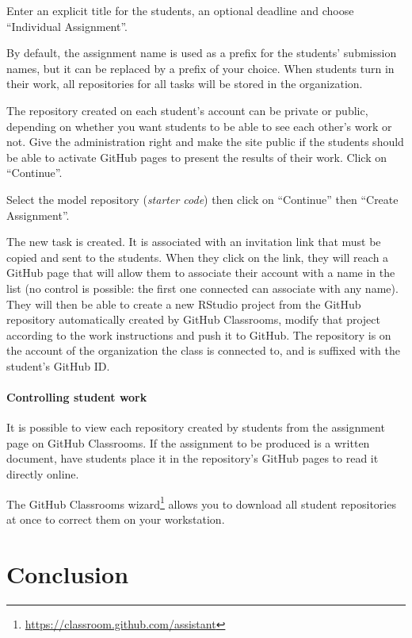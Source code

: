 \documentclass[
  12pt,
  american,
  a4paper,
  extrafontsizes,onecolumn,openright
  ]{memoir}
\begin{document}
Enter an explicit title for the students, an optional deadline and choose \enquote{Individual Assignment}.

By default, the assignment name is used as a prefix for the students' submission names, but it can be replaced by a prefix of your choice.
When students turn in their work, all repositories for all tasks will be stored in the organization.

The repository created on each student's account can be private or public, depending on whether you want students to be able to see each other's work or not.
Give the administration right and make the site public if the students should be able to activate GitHub pages to present the results of their work.
Click on \enquote{Continue}.

Select the model repository (\emph{starter code}) then click on \enquote{Continue} then \enquote{Create Assignment}.

The new task is created.
It is associated with an invitation link that must be copied and sent to the students.
When they click on the link, they will reach a GitHub page that will allow them to associate their account with a name in the list (no control is possible: the first one connected can associate with any name).
They will then be able to create a new RStudio project from the GitHub repository automatically created by GitHub Classrooms, modify that project according to the work instructions and push it to GitHub.
The repository is on the account of the organization the class is connected to, and is suffixed with the student's GitHub ID.

\subsubsection{Controlling student work}\label{controlling-student-work}

It is possible to view each repository created by students from the assignment page on GitHub Classrooms.
If the assignment to be produced is a written document, have students place it in the repository's GitHub pages to read it directly online.

The GitHub Classrooms wizard\footnote{\url{https://classroom.github.com/assistant}} allows you to download all student repositories at once to correct them on your workstation.

\chapter{Conclusion}\label{chap-conclusion}
\end{document}
